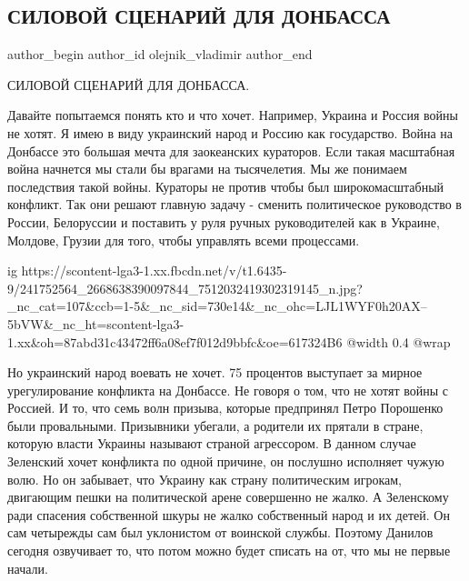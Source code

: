  
 
 
 
 
 
\subsection{СИЛОВОЙ СЦЕНАРИЙ ДЛЯ ДОНБАССА}
\label{sec:13_09_2021.fb.olejnik_vladimir.1.donbass_silovoj_scenarij}
 
\ifcmt
 author_begin
   author_id olejnik_vladimir
 author_end
\fi

СИЛОВОЙ СЦЕНАРИЙ ДЛЯ ДОНБАССА.

Давайте попытаемся понять кто и что хочет. Например, Украина и Россия войны не
хотят. Я имею в виду украинский народ и Россию как государство. Война на
Донбассе это большая мечта для заокеанских кураторов. Если такая масштабная
война начнется мы стали бы врагами на тысячелетия. Мы же понимаем последствия
такой войны. Кураторы не против чтобы был широкомасштабный конфликт. Так они
решают главную задачу - сменить политическое руководство в России, Белоруссии и
поставить у руля ручных руководителей как в Украине, Молдове, Грузии для того,
чтобы управлять всеми процессами. 

\ifcmt
  ig https://scontent-lga3-1.xx.fbcdn.net/v/t1.6435-9/241752564_2668638390097844_7512032419302319145_n.jpg?_nc_cat=107&ccb=1-5&_nc_sid=730e14&_nc_ohc=LJL1WYF0h20AX--5bVW&_nc_ht=scontent-lga3-1.xx&oh=87abd31c43472ff6a08ef7f012d9bbfc&oe=617324B6
  @width 0.4
  @wrap 
\fi

Но украинский народ воевать не хочет. 75 процентов выступает за мирное
урегулирование конфликта на Донбассе. Не говоря о том, что не хотят войны с
Россией. И то, что семь волн призыва, которые предпринял Петро Порошенко были
провальными. Призывники убегали, а родители их прятали в стране, которую власти
Украины называют страной агрессором. В данном случае Зеленский хочет конфликта
по одной причине, он послушно исполняет чужую волю. Но он забывает, что Украину
как страну политическим игрокам, двигающим пешки на политической арене
совершенно не жалко. А Зеленскому ради спасения собственной шкуры не жалко
собственный народ и их детей. Он сам четырежды сам был уклонистом от воинской
службы. Поэтому Данилов сегодня озвучивает то, что потом можно будет списать на
от, что мы не первые начали. 

